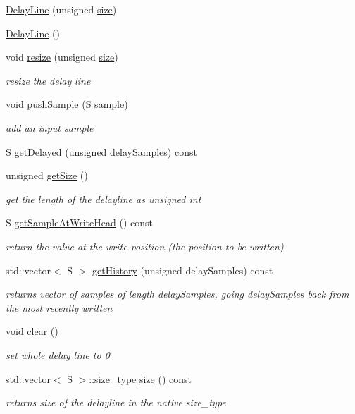 \begin{DoxyCompactItemize}
\item 
\hyperlink{classDelayLine_a73b757b74c011b83782dce44d158edaa}{Delay\+Line} (unsigned \hyperlink{classDelayLine_af7221dcbabeb21cf1458d23c6c17e892}{size})
\item 
\hyperlink{classDelayLine_a43166713f7f497f831d95f348e165f02}{Delay\+Line} ()
\item 
void \hyperlink{classDelayLine_a5b5b9db23797e25f0467917447891d8a}{resize} (unsigned \hyperlink{classDelayLine_af7221dcbabeb21cf1458d23c6c17e892}{size})
\begin{DoxyCompactList}\small\item\em resize the delay line \end{DoxyCompactList}\item 
void \hyperlink{classDelayLine_a1d549e8fada018b51a66c88e3f1d6ec8}{push\+Sample} (S sample)
\begin{DoxyCompactList}\small\item\em add an input sample \end{DoxyCompactList}\item 
S \hyperlink{classDelayLine_a2f2aa31ab509d3ca1949caead021bd31}{get\+Delayed} (unsigned delay\+Samples) const 
\item 
unsigned \hyperlink{classDelayLine_a974138765f721f1978fe3fbb914f9184}{get\+Size} ()
\begin{DoxyCompactList}\small\item\em get the length of the delayline as unsigned int \end{DoxyCompactList}\item 
S \hyperlink{classDelayLine_a3f4d26e27b2a0d6ebdf86e167e3491b2}{get\+Sample\+At\+Write\+Head} () const 
\begin{DoxyCompactList}\small\item\em return the value at the write position (the position to be written) \end{DoxyCompactList}\item 
std\+::vector$<$ S $>$ \hyperlink{classDelayLine_a0e88dcc1ba7968719e7cb328dce398cb}{get\+History} (unsigned delay\+Samples) const 
\begin{DoxyCompactList}\small\item\em returns vector of samples of length delay\+Samples, going delay\+Samples back from the most recently written \end{DoxyCompactList}\item 
void \hyperlink{classDelayLine_a469b230b2f26745a0c648e5504ec5e5c}{clear} ()
\begin{DoxyCompactList}\small\item\em set whole delay line to 0 \end{DoxyCompactList}\item 
std\+::vector$<$ S $>$\+::size\+\_\+type \hyperlink{classDelayLine_af7221dcbabeb21cf1458d23c6c17e892}{size} () const 
\begin{DoxyCompactList}\small\item\em returns size of the delayline in the native size\+\_\+type \end{DoxyCompactList}\end{DoxyCompactItemize}


